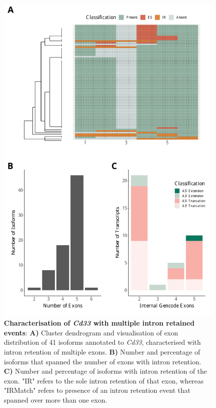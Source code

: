 \begin{figure}[htp]
	\begin{center}
		\includegraphics[page=7,trim={1cm 0cm 0 2cm},scale = 0.55]{Figures/TargetGenes.pdf}
	\end{center}
	\captionsetup{width=0.95\textwidth}
	\caption[Characterisation of \textit{Cd33} with multiple intron retained events]%
	{\textbf{Characterisation of \textit{Cd33} with multiple intron retained events}: \textbf{A)} Cluster dendrogram and visualisation of exon distribution of 41 isoforms annotated to \textit{Cd33}, characterised with intron retention of multiple exons. \textbf{B)} Number and percentage of isoforms that spanned the number of exons with intron retention. \textbf{C)} Number and percentage of isoforms with intron retention of the exon. "IR" refers to the sole intron retention of that exon, whereas "IRMatch" refers to presence of an intron retention event that spanned over more than one exon. 
	}   
	\label{fig:Cd33}
\end{figure}

